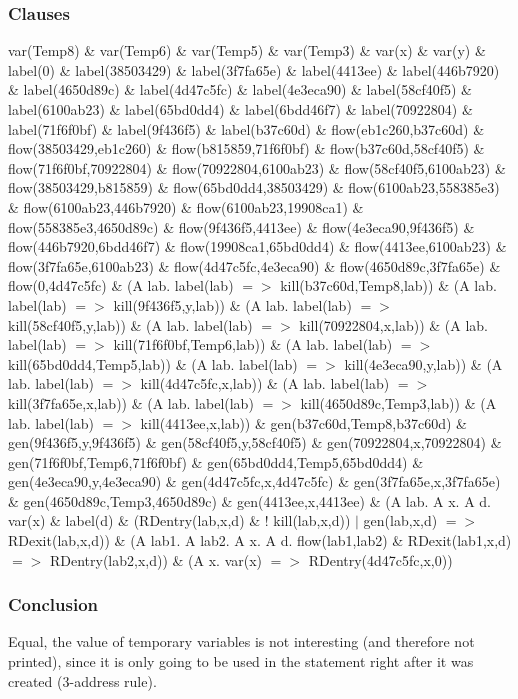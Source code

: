 \documentclass{report}
\begin{document}
\subsubsection{Clauses}
var(Temp8) \& var(Temp6) \& var(Temp5) \& var(Temp3) \& var(x) \& var(y) \& 
label(0) \& label(38503429) \& label(3f7fa65e) \& label(4413ee) \& label(446b7920) \& label(4650d89c) \& label(4d47c5fc) \& label(4e3eca90) \& label(58cf40f5) \& label(6100ab23) \& label(65bd0dd4) \& label(6bdd46f7) \& label(70922804) \& label(71f6f0bf) \& label(9f436f5) \& label(b37c60d) \& 
flow(eb1c260,b37c60d) \& flow(38503429,eb1c260) \& flow(b815859,71f6f0bf) \& flow(b37c60d,58cf40f5) \& flow(71f6f0bf,70922804) \& flow(70922804,6100ab23) \& flow(58cf40f5,6100ab23) \& flow(38503429,b815859) \& flow(65bd0dd4,38503429) \& flow(6100ab23,558385e3) \& flow(6100ab23,446b7920) \& flow(6100ab23,19908ca1) \& flow(558385e3,4650d89c) \& flow(9f436f5,4413ee) \& flow(4e3eca90,9f436f5) \& flow(446b7920,6bdd46f7) \& flow(19908ca1,65bd0dd4) \& flow(4413ee,6100ab23) \& flow(3f7fa65e,6100ab23) \& flow(4d47c5fc,4e3eca90) \& flow(4650d89c,3f7fa65e) \& flow(0,4d47c5fc) \& 
(A lab. label(lab) $=>$ kill(b37c60d,Temp8,lab)) \& (A lab. label(lab) $=>$ kill(9f436f5,y,lab)) \& (A lab. label(lab) $=>$ kill(58cf40f5,y,lab)) \& (A lab. label(lab) $=>$ kill(70922804,x,lab)) \& (A lab. label(lab) $=>$ kill(71f6f0bf,Temp6,lab)) \& (A lab. label(lab) $=>$ kill(65bd0dd4,Temp5,lab)) \& (A lab. label(lab) $=>$ kill(4e3eca90,y,lab)) \& (A lab. label(lab) $=>$ kill(4d47c5fc,x,lab)) \& (A lab. label(lab) $=>$ kill(3f7fa65e,x,lab)) \& (A lab. label(lab) $=>$ kill(4650d89c,Temp3,lab)) \& (A lab. label(lab) $=>$ kill(4413ee,x,lab)) \& 
gen(b37c60d,Temp8,b37c60d) \& gen(9f436f5,y,9f436f5) \& gen(58cf40f5,y,58cf40f5) \& gen(70922804,x,70922804) \& gen(71f6f0bf,Temp6,71f6f0bf) \& gen(65bd0dd4,Temp5,65bd0dd4) \& gen(4e3eca90,y,4e3eca90) \& gen(4d47c5fc,x,4d47c5fc) \& gen(3f7fa65e,x,3f7fa65e) \& gen(4650d89c,Temp3,4650d89c) \& gen(4413ee,x,4413ee) \& 
(A lab. A x. A d. var(x) \& label(d) \& (RDentry(lab,x,d) \& ! kill(lab,x,d)) $|$ gen(lab,x,d) $=>$ RDexit(lab,x,d)) \& 
(A lab1. A lab2. A x. A d. flow(lab1,lab2) \& RDexit(lab1,x,d) $=>$ RDentry(lab2,x,d)) \& 
(A x. var(x) $=>$ RDentry(4d47c5fc,x,0))
\subsubsection{Conclusion}
Equal, the value of temporary variables is not interesting (and therefore not printed), since it is only going to be used in the statement right after it was created (3-address rule).
\end{document}
